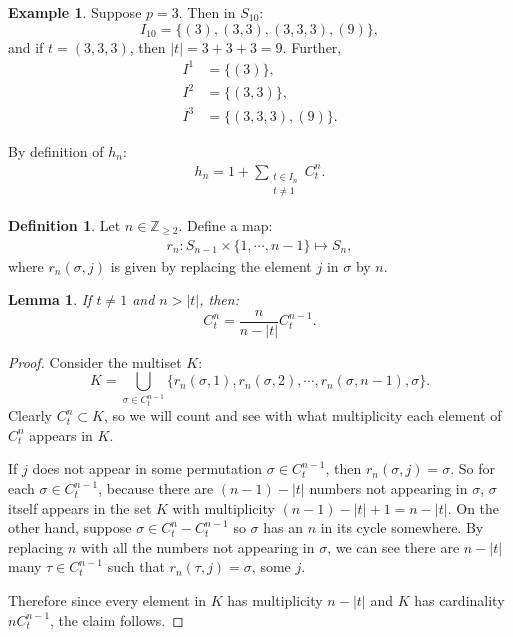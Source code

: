 \documentclass[letterpaper,oneside, 10pt]{amsart}
\newtheorem{lemma}[thm]{Lemma}
\theoremstyle{definition}
\newtheorem{definition}[thm]{Definition}
\newtheorem{example}[thm]{Example}
\numberwithin{equation}{section}
\begin{document}
\begin{example}
Suppose $p=3$. Then in $S_{10}$:
\[
	I_{10} = \{(3), (3,3), (3,3,3), (9)\},
\] 
and if $t=(3,3,3)$, then $|t|=3+3+3=9$. Further,
\begin{align*}
	I^1 &= \{(3)\}, \\
	I^2 &= \{(3,3)\}, \\
	I^3 &= \{(3,3,3), (9)\}.
\end{align*}
\end{example}

By definition of $h_n$:
\begin{align*}
	h_n = 1+ \sum_{\substack{t\in I_n\\ t\neq 1}} C_t^n.
\end{align*}

\begin{definition}
Let $n\in \mathbb{Z}_{\geq 2}$. Define a map:
	\begin{align*}
		r_n:S_{n-1}\times \{1,\cdots, n-1\}\mapsto S_n,
	\end{align*}
where $r_n(\sigma, j)$ is given by replacing the element $j$ in $\sigma$ by $n$.
\end{definition}

\begin{lemma}\label{lemma:C_tn_recurs}
If $t\neq 1$ and $n > |t|$, then:
\[
	C_t^n = \frac{n}{n-|t|}C_t^{n-1}.
\]
\end{lemma}
\begin{proof}
Consider the multiset $K$:
\[
	K = \bigcup_{\sigma\in C_t^{n-1}}\{ r_n(\sigma, 1), r_n(\sigma,2), \cdots, r_n(\sigma, n-1), \sigma\}.
\]
Clearly $C_t^n\subset K$, so we will count and see with what multiplicity each element of $C_t^n$ appears in $K$.

If $j$ does not appear in some permutation $\sigma\in C_t^{n-1}$, then $r_n(\sigma, j)=\sigma$. So for each $\sigma\in C_{t}^{n-1}$, because there are $(n-1)-|t|$ numbers not appearing in $\sigma$, $\sigma$ itself appears in the set $K$ with multiplicity $(n-1)-|t|+1=n-|t|$. 
On the other hand, suppose $\sigma\in C_t^n-C_t^{n-1}$ so $\sigma$ has an $n$ in its cycle somewhere. By replacing $n$ with all the numbers not appearing in $\sigma$, we can see there are $n-|t|$ many $\tau\in C_t^{n-1}$ such that $r_n(\tau, j)=\sigma$, some $j$. 

Therefore since every element in $K$ has multiplicity $n-|t|$ and $K$ has cardinality $nC_t^{n-1}$, the claim follows.
\end{proof}
\end{document}
